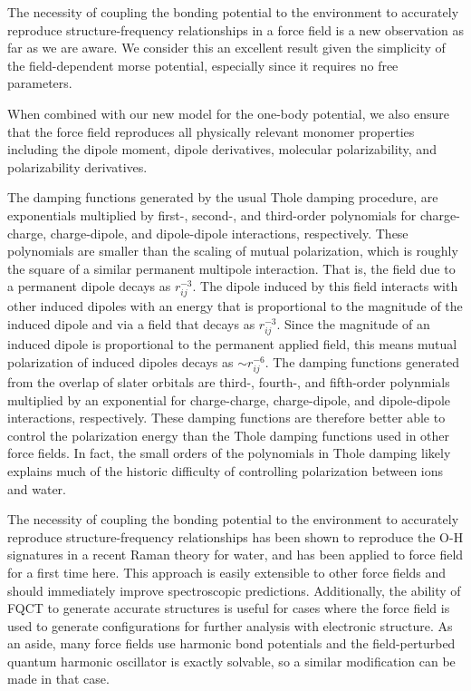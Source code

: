 \documentclass[journal=jctcce,manuscript=article]{achemso}
\begin{document}
The necessity of coupling the bonding potential to the environment to accurately reproduce structure-frequency relationships in a force field is a new observation as far as we are aware. We consider this an excellent result given the simplicity of the field-dependent morse potential, especially since it requires no free parameters. 

When combined with our new model for the one-body potential, we also ensure that the force field reproduces all physically relevant monomer properties including the dipole moment, dipole derivatives,
molecular polarizability, and polarizability derivatives. 

The damping functions generated by the usual Thole damping procedure\cite{thole1981molecular},
are exponentials multiplied by first-, second-, and third-order polynomials
for charge-charge, charge-dipole, and dipole-dipole interactions, respectively.\cite{thole1981molecular}
These polynomials are smaller than the scaling of mutual polarization, which is roughly the square
of a similar permanent multipole interaction. That is, the field due to a permanent dipole
decays as $r_{ij}^{-3}$. The dipole induced by this field interacts with other induced dipoles
with an energy that is proportional to the magnitude of the induced dipole and via a field
that decays as $r_{ij}^{-3}$. Since the magnitude of an induced dipole is proportional to
the permanent applied field, this means mutual polarization of induced dipoles decays as $\sim$$r_{ij}^{-6}$. The damping functions generated from the overlap of slater orbitals are
third-, fourth-, and fifth-order polynmials multiplied by an exponential for charge-charge, charge-dipole,
and dipole-dipole interactions, respectively. These damping functions are therefore better able
to control the polarization energy than the Thole damping functions used in other force fields.
In fact, the small orders of the polynomials in Thole damping likely explains much of the historic difficulty of controlling
polarization between ions and water.\cite{jiao2006simulation,mason2012accurate}

 The necessity of coupling the bonding potential to the environment to accurately reproduce structure-frequency relationships has been shown to reproduce the O-H signatures in a recent Raman theory for water\cite{LaCour2023}, and has been applied to force field for a first time here. This approach is easily extensible to other force fields and should immediately improve spectroscopic predictions. Additionally, the ability of FQCT to generate accurate structures is useful for cases where the force field is used to generate configurations for further analysis with electronic structure. As an aside, many force fields use harmonic bond potentials and the field-perturbed quantum harmonic oscillator is exactly solvable, so a similar modification can be made in that case.
\end{document}
